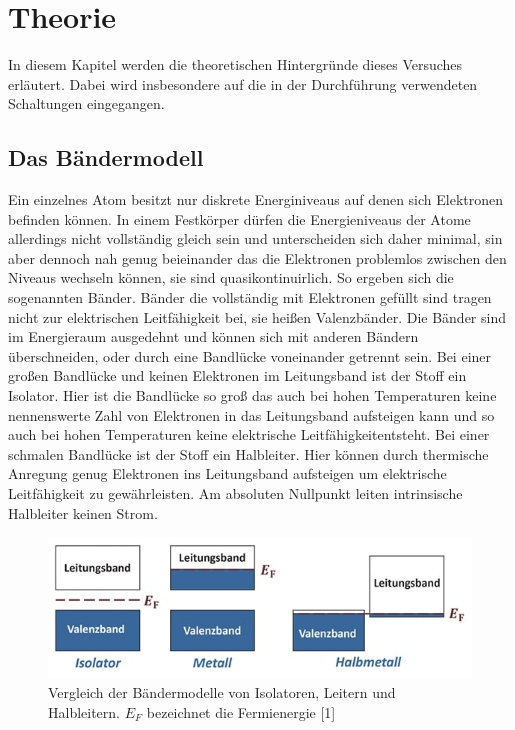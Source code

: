 \section{Theorie} 
\label{sec:Theorie}

In diesem Kapitel werden die theoretischen Hintergründe dieses Versuches erläutert. Dabei wird insbesondere auf die in der Durchführung verwendeten Schaltungen eingegangen.
\subsection{Das Bändermodell}
\label{sec:baendermodell}
Ein einzelnes Atom besitzt nur diskrete Energiniveaus auf denen sich Elektronen befinden können. In einem 
Festkörper dürfen die Energieniveaus der Atome allerdings nicht vollständig gleich sein und unterscheiden sich 
daher minimal, sin aber dennoch nah genug beieinander das die Elektronen problemlos zwischen den Niveaus 
wechseln können, sie sind quasikontinuirlich. So ergeben sich die sogenannten Bänder. Bänder die vollständig 
mit Elektronen gefüllt sind tragen nicht zur elektrischen Leitfähigkeit bei, sie heißen Valenzbänder. 
Die Bänder sind im Energieraum ausgedehnt und können sich mit anderen Bändern überschneiden, oder durch eine 
Bandlücke voneinander getrennt sein. Bei einer großen Bandlücke und keinen Elektronen im Leitungsband
ist der Stoff ein Isolator. Hier ist die Bandlücke so groß das auch bei hohen Temperaturen keine nennenswerte Zahl
von Elektronen in das Leitungsband aufsteigen kann und so auch bei hohen Temperaturen keine elektrische
Leitfähigkeitentsteht. Bei einer schmalen Bandlücke ist der Stoff ein Halbleiter. Hier können durch thermische 
Anregung genug Elektronen ins Leitungsband aufsteigen um elektrische Leitfähigkeit zu gewährleisten. Am absoluten
Nullpunkt leiten intrinsische Halbleiter keinen Strom.
\begin{figure}
    \centering
    \includegraphics[width=1\textwidth]{content/grafiken/baender.JPG}
    \caption{Vergleich der Bändermodelle von Isolatoren, Leitern und Halbleitern. $E_F$ bezeichnet die Fermienergie [1]}
    \label{fig:baendermodell}
  \end{figure}

